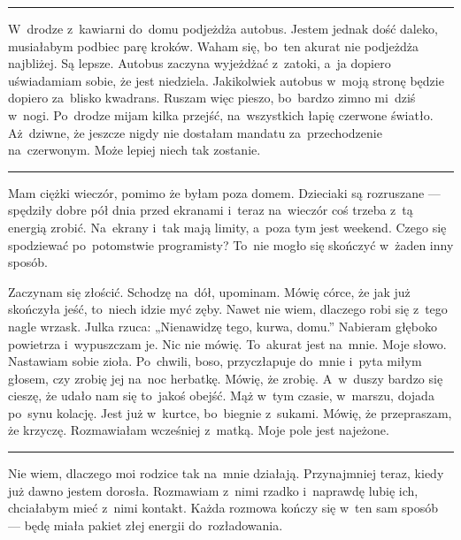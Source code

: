 \documentclass[9pt, a5paper]{memoir}
\begin{document}
\fancybreak{* \quad * \quad *}

W~drodze z~kawiarni do~domu podjeżdża autobus. Jestem jednak dość daleko, musiałabym podbiec parę kroków. Waham się, bo~ten akurat nie podjeżdża najbliżej. Są lepsze. Autobus zaczyna wyjeżdżać z~zatoki, a~ja dopiero uświadamiam sobie, że jest niedziela. Jakikolwiek autobus w~moją stronę będzie dopiero za~blisko kwadrans. Ruszam więc pieszo, bo~bardzo zimno mi~dziś w~nogi. Po~drodze mijam kilka przejść, na~wszystkich łapię czerwone światło. Aż~dziwne, że jeszcze nigdy nie dostałam mandatu za~przechodzenie na~czerwonym. Może lepiej niech tak zostanie.

\fancybreak{* \quad * \quad *}

Mam ciężki wieczór, pomimo że byłam poza domem. Dzieciaki są rozruszane --- spędziły dobre pół dnia przed ekranami i~teraz na~wieczór coś trzeba z~tą energią zrobić. Na~ekrany i~tak mają limity, a~poza tym jest weekend. Czego się spodziewać po~potomstwie programisty? To~nie mogło się skończyć w~żaden inny sposób.

Zaczynam się złościć. Schodzę na~dół, upominam. Mówię córce, że jak już skończyła jeść, to~niech idzie myć zęby. Nawet nie wiem, dlaczego robi się z~tego nagle wrzask. Julka rzuca: „Nienawidzę tego, kurwa, domu.” Nabieram głęboko powietrza i~wypuszczam je. Nic nie mówię. To~akurat jest na~mnie. Moje słowo. Nastawiam sobie zioła. Po~chwili, boso, przyczłapuje do~mnie i~pyta miłym głosem, czy zrobię jej na~noc herbatkę. Mówię, że zrobię. A~w~duszy bardzo się cieszę, że udało nam się to~jakoś obejść. Mąż w~tym czasie, w~marszu, dojada po~synu kolację. Jest już w~kurtce, bo~biegnie z~sukami. Mówię, że przepraszam, że krzyczę. Rozmawiałam wcześniej z~matką. Moje pole jest najeżone.

\fancybreak{* \quad * \quad *}

Nie wiem, dlaczego moi rodzice tak na~mnie działają. Przynajmniej teraz, kiedy już dawno jestem dorosła. Rozmawiam z~nimi rzadko i~naprawdę lubię ich, chciałabym mieć z~nimi kontakt. Każda rozmowa kończy się w~ten sam sposób --- będę miała pakiet złej energii do~rozładowania.
\end{document}
